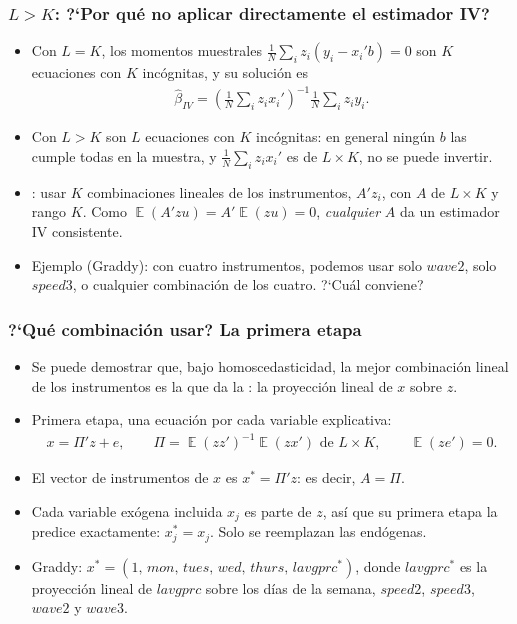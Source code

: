 \documentclass[t, compress, spanish, aspectratio=169]{beamer}
\newcommand{\term}[1]{\structure{\textbf{#1}}} %
\DeclareMathOperator{\E}{\mathbb{E}}
\begin{document}
\begin{frame}
	\frametitle{$L>K$: ?`Por qu\'e no aplicar directamente el estimador IV?}
	\begin{itemize}
		\item Con $L=K$, los momentos muestrales $\frac{1}{N}\sum_i z_i(y_i-x_i'b)=0$ son $K$ ecuaciones con $K$ inc\'ognitas, y su soluci\'on es
		\begin{align*}
			\hat\beta_{IV}=\left(\frac{1}{N}\sum_i z_ix_i'\right)^{-1}\frac{1}{N}\sum_i z_iy_i.
		\end{align*}
		\item Con $L>K$ son $L$ ecuaciones con $K$ inc\'ognitas: en general ning\'un $b$ las cumple todas en la muestra, y $\frac{1}{N}\sum_i z_ix_i'$ es de $L\times K$, no se puede invertir.
		\item \term{Soluci\'on}: usar $K$ combinaciones lineales de los instrumentos, $A'z_i$, con $A$ de $L\times K$ y rango $K$. Como $\E(A'zu)=A'\E(zu)=0$, \emph{cualquier} $A$ da un estimador IV consistente.
		\item Ejemplo (Graddy): con cuatro instrumentos, podemos usar solo $wave2$, solo $speed3$, o cualquier combinaci\'on de los cuatro. ?`Cu\'al conviene?
	\end{itemize}
\end{frame}
\begin{frame}
	\frametitle{?`Qu\'e combinaci\'on usar? La primera etapa}
	\small
	\begin{itemize}
		\item Se puede demostrar que, bajo homoscedasticidad, la mejor combinaci\'on lineal de los instrumentos es la que da la \term{primera etapa}: la proyecci\'on lineal de $x$ sobre $z$.
		\item Primera etapa, una ecuaci\'on por cada variable explicativa:
		\begin{align*}
		x=\Pi'z+e,\qquad \Pi=\E(zz')^{-1}\E(zx') \text{ de } L\times K, \qquad \E(ze')=0.
		\end{align*}
		\item El vector de instrumentos de $x$ es $x^*=\Pi'z$: es decir, $A=\Pi$.
		\item Cada variable ex\'ogena incluida $x_j$ es parte de $z$, as\'i que su primera etapa la predice exactamente: $x_j^*=x_j$. Solo se reemplazan las end\'ogenas.
		\item Graddy: $x^*=(1,\, mon,\, tues,\, wed,\, thurs,\, lavgprc^*)$, donde $lavgprc^*$ es la proyecci\'on lineal de $lavgprc$ sobre los d\'ias de la semana, $speed2$, $speed3$, $wave2$ y $wave3$.
	\end{itemize}
\end{frame}
\end{document}
